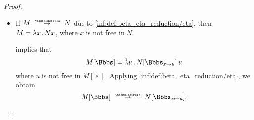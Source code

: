 \begin{proof}
\begin{itemize}
     implies that
    \begin{equation*}
      A[\Bbbs_{x \mapsto u}][u \mapsto B[\Bbbs]] \aequiv A[\Bbbs_{x \mapsto B[\Bbbs]}],
    \end{equation*}
    hence, due to \ref{inf:def:lambda_term_reduction/alpha},
    \begin{equation}\label{eq:thm:substitution_on_single_step_reduction/proof/beta/m}
      M[\Bbbs] \pred A[\Bbbs_{x \mapsto B[\Bbbs]}].
    \end{equation}

    Now we must examine \( N[\Bbbs] = A[x \mapsto B][\Bbbs] \). The \hyperref[def:lambda_substitution_composition]{composed substitution} behaves as follows:
    \begin{equation*}
      \parens[\big]{ \Bbbs \bincirc \id_{x \mapsto B} }(a) =
      \begin{cases}
        B[\Bbbs], &a = B, \\
        \Bbbs(a), &\T{otherwise.}
      \end{cases}
    \end{equation*}

    It thus coincides with \( \Bbbs_{x \mapsto B[\Bbbs]} \).

     then implies that
    \begin{equation*}
      N[\Bbbs]
      =
      A[x \mapsto B][\Bbbs]
      \aequiv
      A[\Bbbs_{x \mapsto B[\Bbbs]}].
    \end{equation*}

    This is precisely the right side of \eqref{eq:thm:substitution_on_single_step_reduction/proof/beta/m}.

    Again, due to \ref{inf:def:lambda_term_reduction/alpha}, we obtain
    \begin{equation*}
      M[\Bbbs] \pred N[\Bbbs],
    \end{equation*}
    as desired.

    \item If \( M \pred N \) due to \ref{inf:def:beta_eta_reduction/eta}, then \( M = \qabs x N x \), where \( x \) is not free in \( N \).

     implies that
    \begin{equation*}
      M[\Bbbs] = \qabs u N[\Bbbs_{x \mapsto u}] \thinspace u
    \end{equation*}
    where \( u \) is not free in \( M[\Bbbs] \). Applying \ref{inf:def:beta_eta_reduction/eta}, we obtain
    \begin{equation*}
      M[\Bbbs] \pred N[\Bbbs_{x \mapsto u}].
    \end{equation*}


\end{itemize}
\end{proof}
